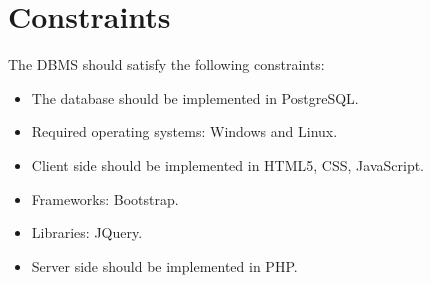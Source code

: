 \section{Constraints}
The DBMS should satisfy the following constraints:
\begin{itemize}
    \item The database should be implemented in PostgreSQL.
    \item Required operating systems: Windows and Linux.
    \item Client side should be implemented in HTML5, CSS, JavaScript.
    \item Frameworks: Bootstrap.
    \item Libraries: JQuery.
    \item Server side should be implemented in PHP.
\end{itemize}